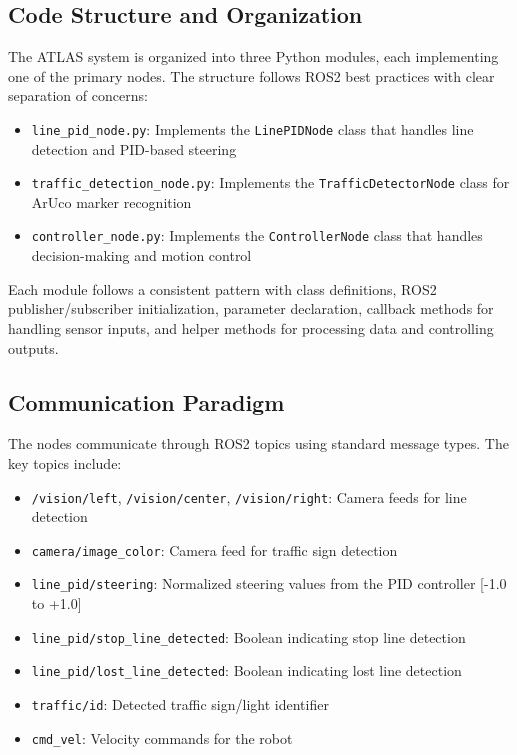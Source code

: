 \documentclass[9pt,technote]{IEEEtran}
\begin{document}
\subsection{Code Structure and Organization}
The ATLAS system is organized into three Python modules, each implementing one of the primary nodes. The structure follows ROS2 best practices with clear separation of concerns:

\begin{itemize}
    \item \texttt{line\_pid\_node.py}: Implements the \texttt{LinePIDNode} class that handles line detection and PID-based steering
    \item \texttt{traffic\_detection\_node.py}: Implements the \texttt{TrafficDetectorNode} class for ArUco marker recognition
    \item \texttt{controller\_node.py}: Implements the \texttt{ControllerNode} class that handles decision-making and motion control
\end{itemize}

Each module follows a consistent pattern with class definitions, ROS2 publisher/subscriber initialization, parameter declaration, callback methods for handling sensor inputs, and helper methods for processing data and controlling outputs.

\subsection{Communication Paradigm}
The nodes communicate through ROS2 topics using standard message types. The key topics include:

\begin{itemize}
    \item \texttt{/vision/left}, \texttt{/vision/center}, \texttt{/vision/right}: Camera feeds for line detection
    \item \texttt{camera/image\_color}: Camera feed for traffic sign detection
    \item \texttt{line\_pid/steering}: Normalized steering values from the PID controller [-1.0 to +1.0]
    \item \texttt{line\_pid/stop\_line\_detected}: Boolean indicating stop line detection
    \item \texttt{line\_pid/lost\_line\_detected}: Boolean indicating lost line detection
    \item \texttt{traffic/id}: Detected traffic sign/light identifier
    \item \texttt{cmd\_vel}: Velocity commands for the robot
\end{itemize}
\end{document}

